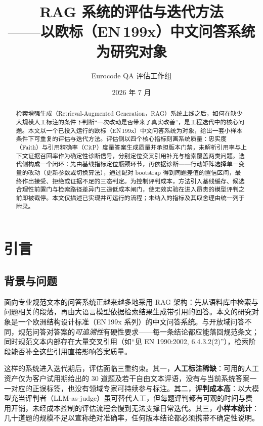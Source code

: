 \documentclass[11pt,a4paper,fontset=fandol]{ctexart}
\title{\bfseries RAG 系统的评估与迭代方法\\[4pt]
\large ——以欧标（EN\,199x）中文问答系统为研究对象}
\author{Eurocode QA 评估工作组}
\date{2026 年 7 月}
\begin{document}
\maketitle

\begin{abstract}
检索增强生成（Retrieval-Augmented Generation，RAG）系统上线之后，如何在缺少大规模人工标注的条件下判断``一次改动是否带来了真实改善''，是工程迭代中的核心问题。本文以一个已投入运行的欧标（EN\,199x）中文问答系统为对象，给出一套小样本条件下可重复的评估与迭代方法。评估侧以四个核心指标刻画系统质量：忠实度（Faith）与引用精确率（CitP）度量答案生成质量并承担版本门禁，未解析引用率与上下文证据召回率作为确定性诊断信号，分别定位交叉引用补充与检索覆盖两类问题。迭代侧构成一个闭环：先由基线指标定位瓶颈环节，再依据诊断——行动矩阵选择单一变量的改动（更新参数或切换算法），通过配对 bootstrap 得到同题差值的置信区间，最终作出接受、拒绝或证据不足的三态判定。为控制评判成本，方法引入基线缓存、候选合理性前置门与检索路径差异门三道低成本闸门，使无效实验在进入昂贵的模型评判之前即被截停。本文仅描述已实现并可运行的流程；未纳入的指标及其取舍理由统一列于附录。
\end{abstract}

\clearpage
\tableofcontents

\clearpage
\section{引言}

\subsection{背景与问题}

面向专业规范文本的问答系统正越来越多地采用 RAG 架构\cite{rag}：先从语料库中检索与问题相关的段落，再由大语言模型依据检索结果生成带引用的回答。本文的研究对象是一个欧洲结构设计标准（EN\,199x 系列）的中文问答系统。与开放域问答不同，规范问答对答案的\emph{可追溯性}有硬性要求——每一条结论都应能落回规范条文；同时规范文本内部存在大量交叉引用（如``见 EN 1990:2002, 6.4.3.2(2)''），检索阶段能否补全这些引用直接影响答案质量。

这样的系统进入迭代期后，评估面临三重约束。其一，\textbf{人工标注稀缺}：可用的人工资产仅为客户试用期给出的 30 道题及若干自由文本评语，没有与当前系统答案一一对应的正误标签，也没有领域专家可持续参与标注。其二，\textbf{评判成本高}：以大模型充当评判者（LLM-as-judge\cite{zheng2023judge}）虽可替代人工，但每题评判都有可观的时间与费用开销，未经成本控制的评估流程会慢到无法支撑日常迭代。其三，\textbf{小样本统计}：几十道题的规模不足以宣称绝对准确率，任何版本结论都必须携带不确定性说明。
\end{document}
